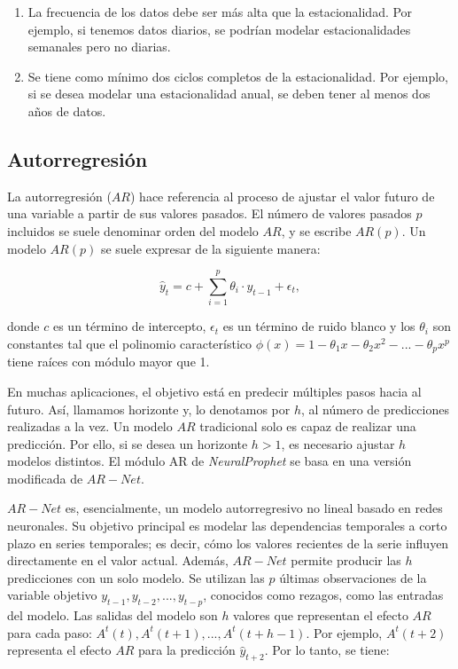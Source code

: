 \documentclass[12pt,twoside]{article}
\begin{document}
\begin{enumerate}
    \item La frecuencia de los datos debe ser más alta que la estacionalidad. Por ejemplo, si tenemos datos diarios, se podrían modelar estacionalidades semanales pero no diarias.
    \item Se tiene como mínimo dos ciclos completos de la estacionalidad. Por ejemplo, si se desea modelar una estacionalidad anual, se deben tener al menos dos años de datos.
\end{enumerate}

\subsection{Autorregresión}\label{sec:24}

La autorregresión ($AR$) hace referencia al proceso de ajustar el valor futuro de una variable a partir de sus valores pasados. El número de valores pasados $p$ incluidos se suele denominar orden del modelo $AR$, y se escribe $AR(p)$. Un modelo $AR(p)$ se suele expresar de la siguiente manera:

\begin{equation}
\hat{y}_t = c + \sum_{i=1}^p \theta_i \cdot y_{t-1}+ \epsilon_t,
\end{equation}

donde $c$ es un término de intercepto, $\epsilon_t$ es un término de ruido blanco y los $\theta_i$ son constantes tal que el polinomio característico $\phi (x)=1-\theta_1x-\theta_2x^2-...-\theta_px^p$ tiene raíces con módulo mayor que 1.

En muchas aplicaciones, el objetivo está en predecir múltiples pasos hacia al futuro. Así, llamamos horizonte y, lo denotamos por $h$, al número de predicciones realizadas a la vez. Un modelo $AR$ tradicional solo es capaz de realizar una predicción. Por ello, si se desea un horizonte $h>1$, es necesario ajustar $h$ modelos distintos. El módulo AR de \textit{NeuralProphet} se basa en una versión modificada de $AR-Net$.

$AR-Net$ es, esencialmente, un modelo autorregresivo no lineal basado en redes neuronales. Su objetivo principal es modelar las dependencias temporales a corto plazo en series temporales; es decir, cómo los valores recientes de la serie influyen directamente en el valor actual. Además, $AR-Net$ permite producir las $h$ predicciones con un solo modelo. Se utilizan las $p$ últimas observaciones de la variable objetivo $y_{t-1},y_{t-2},...,y_{t-p}$, conocidos como rezagos, como las entradas del modelo. Las salidas del modelo son $h$ valores que representan el efecto $AR$ para cada paso: $A^t(t),A^t(t+1),...,A^t(t+h-1)$. Por ejemplo, $A^t(t+2)$ representa el efecto $AR$ para la predicción $\hat{y}_{t+2}$. Por lo tanto, se tiene:
\end{document}
